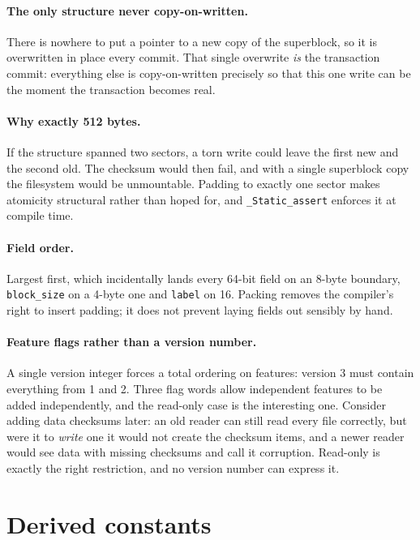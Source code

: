 \paragraph{The only structure never copy-on-written.} There is nowhere to put a
pointer to a new copy of the superblock, so it is overwritten in place every
commit. That single overwrite \emph{is} the transaction commit: everything else
is copy-on-written precisely so that this one write can be the moment the
transaction becomes real.

\paragraph{Why exactly 512 bytes.} If the structure spanned two sectors, a torn
write could leave the first new and the second old. The checksum would then
fail, and with a single superblock copy the filesystem would be unmountable.
Padding to exactly one sector makes atomicity structural rather than hoped for,
and \texttt{\_Static\_assert} enforces it at compile time.

\paragraph{Field order.} Largest first, which incidentally lands every 64-bit
field on an 8-byte boundary, \texttt{block\_size} on a 4-byte one and
\texttt{label} on 16. Packing removes the compiler's right to insert padding; it
does not prevent laying fields out sensibly by hand.

\paragraph{Feature flags rather than a version number.} A single version integer
forces a total ordering on features: version 3 must contain everything from 1
and 2. Three flag words allow independent features to be added independently,
and the read-only case is the interesting one. Consider adding data checksums
later: an old reader can still read every file correctly, but were it to
\emph{write} one it would not create the checksum items, and a newer reader
would see data with missing checksums and call it corruption. Read-only is
exactly the right restriction, and no version number can express it.

\section{Derived constants}
\label{sec:derived}

